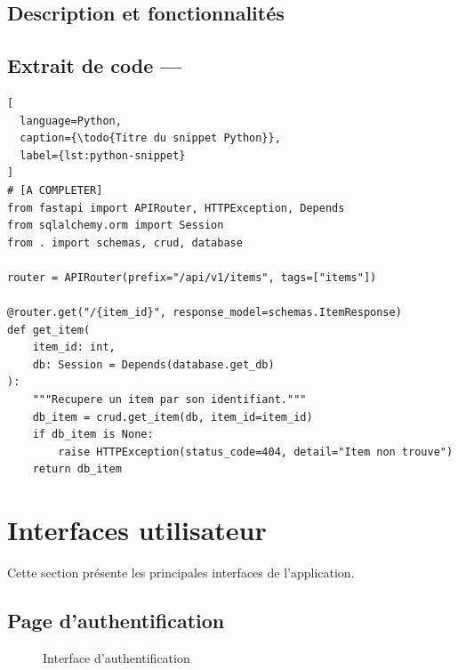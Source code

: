 \subsection{Description et fonctionnalités}


\subsection{Extrait de code — }

\begin{lstlisting}[
  language=Python,
  caption={\todo{Titre du snippet Python}},
  label={lst:python-snippet}
]
# [A COMPLETER]
from fastapi import APIRouter, HTTPException, Depends
from sqlalchemy.orm import Session
from . import schemas, crud, database

router = APIRouter(prefix="/api/v1/items", tags=["items"])

@router.get("/{item_id}", response_model=schemas.ItemResponse)
def get_item(
    item_id: int,
    db: Session = Depends(database.get_db)
):
    """Recupere un item par son identifiant."""
    db_item = crud.get_item(db, item_id=item_id)
    if db_item is None:
        raise HTTPException(status_code=404, detail="Item non trouve")
    return db_item
\end{lstlisting}

\section{Interfaces utilisateur}
\label{sec:real:ui}

Cette section présente les principales interfaces de l'application.

\subsection{Page d'authentification}

\begin{figure}[H]
  \centering
  \caption{Interface d'authentification}
  \label{fig:ui-login}
\end{figure}


